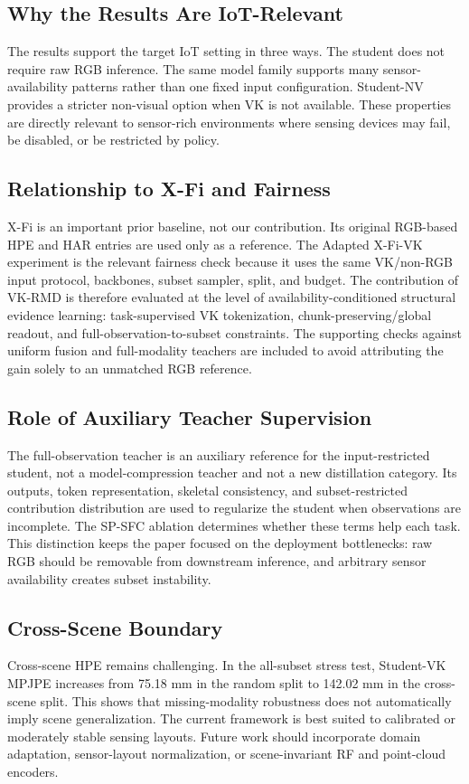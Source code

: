 ﻿\documentclass[journal]{IEEEtran}
\newcommand{\method}{VK-RMD}
\newcommand{\mpjpe}{MPJPE}
\begin{document}
\subsection{Why the Results Are IoT-Relevant}
The results support the target IoT setting in three ways. The student does not require raw RGB inference. The same model family supports many sensor-availability patterns rather than one fixed input configuration. Student-NV provides a stricter non-visual option when VK is not available. These properties are directly relevant to sensor-rich environments where sensing devices may fail, be disabled, or be restricted by policy.

\subsection{Relationship to X-Fi and Fairness}
X-Fi is an important prior baseline, not our contribution. Its original RGB-based HPE and HAR entries are used only as a reference. The Adapted X-Fi-VK experiment is the relevant fairness check because it uses the same VK/non-RGB input protocol, backbones, subset sampler, split, and budget. The contribution of \method{} is therefore evaluated at the level of availability-conditioned structural evidence learning: task-supervised VK tokenization, chunk-preserving/global readout, and full-observation-to-subset constraints. The supporting checks against uniform fusion and full-modality teachers are included to avoid attributing the gain solely to an unmatched RGB reference.

\subsection{Role of Auxiliary Teacher Supervision}
The full-observation teacher is an auxiliary reference for the input-restricted student, not a model-compression teacher and not a new distillation category. Its outputs, token representation, skeletal consistency, and subset-restricted contribution distribution are used to regularize the student when observations are incomplete. The SP-SFC ablation determines whether these terms help each task. This distinction keeps the paper focused on the deployment bottlenecks: raw RGB should be removable from downstream inference, and arbitrary sensor availability creates subset instability.

\subsection{Cross-Scene Boundary}
Cross-scene HPE remains challenging. In the all-subset stress test, Student-VK \mpjpe{} increases from 75.18 mm in the random split to 142.02 mm in the cross-scene split. This shows that missing-modality robustness does not automatically imply scene generalization. The current framework is best suited to calibrated or moderately stable sensing layouts. Future work should incorporate domain adaptation, sensor-layout normalization, or scene-invariant RF and point-cloud encoders.
\end{document}
